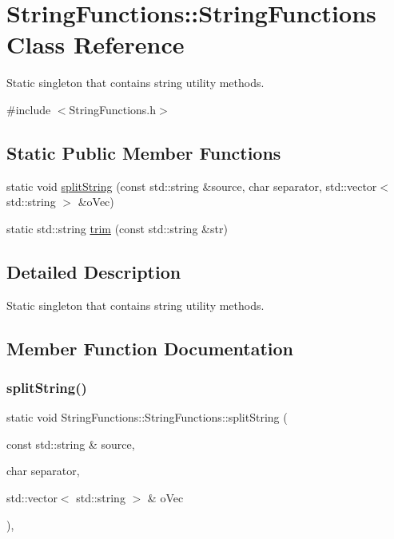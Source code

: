 \hypertarget{class_string_functions_1_1_string_functions}{}\section{String\+Functions\+::String\+Functions Class Reference}
\label{class_string_functions_1_1_string_functions}


Static singleton that contains string utility methods.  




{\ttfamily \#include $<$String\+Functions.\+h$>$}

\subsection*{Static Public Member Functions}
\begin{DoxyCompactItemize}
\item 
static void \mbox{\hyperlink{class_string_functions_1_1_string_functions_ad3aa0a66a39c3fbe2f7b35e750b1338a}{split\+String}} (const std\+::string \&source, char separator, std\+::vector$<$ std\+::string $>$ \&o\+Vec)
\item 
static std\+::string \mbox{\hyperlink{class_string_functions_1_1_string_functions_aba4b51cf55e212fb831fcf146003f35f}{trim}} (const std\+::string \&str)
\end{DoxyCompactItemize}


\subsection{Detailed Description}
Static singleton that contains string utility methods. 

\subsection{Member Function Documentation}
\mbox{\label{class_string_functions_1_1_string_functions_ad3aa0a66a39c3fbe2f7b35e750b1338a}} 
\subsubsection{\texorpdfstring{splitString()}{splitString()}}
{\footnotesize\ttfamily static void String\+Functions\+::\+String\+Functions\+::split\+String (\begin{DoxyParamCaption}\item[{const std\+::string \&}]{source,  }\item[{char}]{separator,  }\item[{std\+::vector$<$ std\+::string $>$ \&}]{o\+Vec }\end{DoxyParamCaption})\hspace{0.3cm}{\ttfamily [inline]}, {\ttfamily [static]}}


